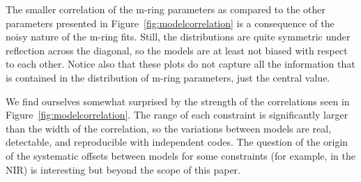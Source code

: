 The smaller correlation of the m-ring parameters as compared to the other parameters presented in Figure~\ref{fig:modelcorrelation} is a consequence of the noisy nature of the m-ring fits.  Still, the distributions are quite symmetric under reflection across the diagonal, so the models are at least not biased with respect to each other.  Notice also that these plots do not capture all the information that is contained in the distribution of m-ring parameters, just the central value.

We find ourselves somewhat surprised by the strength of the correlations seen in Figure~\ref{fig:modelcorrelation}.  The range of each constraint is significantly larger than the width of the correlation, so the variations between models are real, detectable, and reproducible with independent codes.  The question of the origin of the systematic offsets between models for some constraints (for example, in the NIR) is interesting but beyond the scope of this paper.





